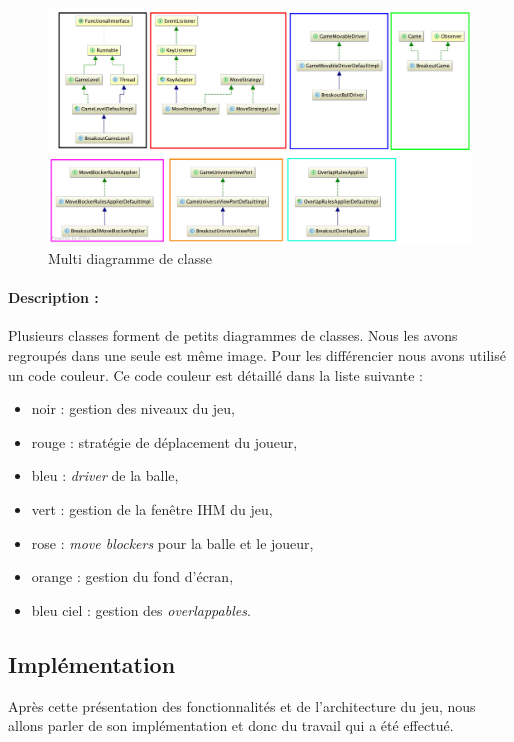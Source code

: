\documentclass[a4paper,10pt]{article}
\begin{document}
 		\FloatBarrier
 		\begin{figure}[!h]
     		\begin{center}
 	  	  	\includegraphics[scale=0.2]{images/whiteSeveralDiagram.jpg}
           	\caption{Multi diagramme de classe}
     		\end{center}
 		\end{figure}
 		\FloatBarrier
 		\paragraph{Description :}
 		Plusieurs classes forment de petits diagrammes de classes. Nous les avons regroupés dans une seule est même image.
 		Pour les différencier
 		nous avons utilisé un code couleur. Ce code couleur est détaillé dans la liste suivante : \\
 		\begin{itemize}
 		\item noir : gestion des niveaux du jeu,
 		\item rouge : stratégie de déplacement du joueur,
 		\item bleu : \textit{driver} de la balle,
 		\item vert : gestion de la fenêtre IHM du jeu,
 		\item rose : \textit{move blockers} pour la balle et le joueur,
 		\item orange : gestion du fond d'écran,
 		\item bleu ciel : gestion des \textit{overlappables}.
 		\end{itemize}


\subsection{Implémentation}
    Après cette présentation des fonctionnalités et de l'architecture du jeu, nous allons
    parler de son implémentation et donc du travail qui a été effectué.
\end{document}
